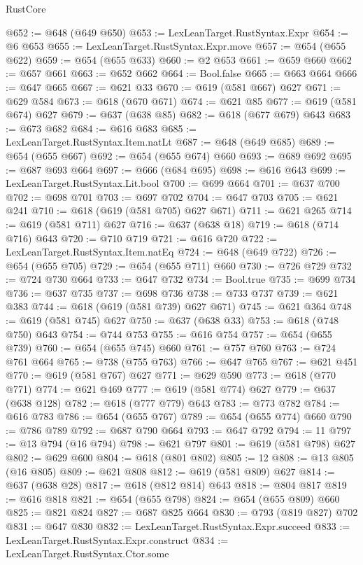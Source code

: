 \begin{lexlean}{RustCore}
\begin{coremodule}
@652 := @648 (@649 @650)
@653 := LexLeanTarget.RustSyntax.Expr
@654 := @6 @653
@655 := LexLeanTarget.RustSyntax.Expr.move
@657 := @654 (@655 @622)
@659 := @654 (@655 @633)
@660 := @2 @653
@661 := @659 @660
@662 := @657 @661
@663 := @652 @662
@664 := Bool.false
@665 := @663 @664
@666 := @647 @665
@667 := @621 @33
@670 := @619 (@581 @667) @627
@671 := @629 @584
@673 := @618 (@670 @671)
@674 := @621 @85
@677 := @619 (@581 @674) @627
@679 := @637 (@638 @85)
@682 := @618 (@677 @679) @643
@683 := @673 @682
@684 := @616 @683
@685 := LexLeanTarget.RustSyntax.Item.natLt
@687 := @648 (@649 @685)
@689 := @654 (@655 @667)
@692 := @654 (@655 @674) @660
@693 := @689 @692
@695 := @687 @693 @664
@697 := @666 (@684 @695)
@698 := @616 @643
@699 := LexLeanTarget.RustSyntax.Lit.bool
@700 := @699 @664
@701 := @637 @700
@702 := @698 @701
@703 := @697 @702
@704 := @647 @703
@705 := @621 @241
@710 := @618 (@619 (@581 @705) @627 @671)
@711 := @621 @265
@714 := @619 (@581 @711) @627
@716 := @637 (@638 @18)
@719 := @618 (@714 @716) @643
@720 := @710 @719
@721 := @616 @720
@722 := LexLeanTarget.RustSyntax.Item.natEq
@724 := @648 (@649 @722)
@726 := @654 (@655 @705)
@729 := @654 (@655 @711) @660
@730 := @726 @729
@732 := @724 @730 @664
@733 := @647 @732
@734 := Bool.true
@735 := @699 @734
@736 := @637 @735
@737 := @698 @736
@738 := @733 @737
@739 := @621 @383
@744 := @618 (@619 (@581 @739) @627 @671)
@745 := @621 @364
@748 := @619 (@581 @745) @627
@750 := @637 (@638 @33)
@753 := @618 (@748 @750) @643
@754 := @744 @753
@755 := @616 @754
@757 := @654 (@655 @739)
@760 := @654 (@655 @745) @660
@761 := @757 @760
@763 := @724 @761 @664
@765 := @738 (@755 @763)
@766 := @647 @765
@767 := @621 @451
@770 := @619 (@581 @767) @627
@771 := @629 @590
@773 := @618 (@770 @771)
@774 := @621 @469
@777 := @619 (@581 @774) @627
@779 := @637 (@638 @128)
@782 := @618 (@777 @779) @643
@783 := @773 @782
@784 := @616 @783
@786 := @654 (@655 @767)
@789 := @654 (@655 @774) @660
@790 := @786 @789
@792 := @687 @790 @664
@793 := @647 @792
@794 := 11
@797 := @13 @794 (@16 @794)
@798 := @621 @797
@801 := @619 (@581 @798) @627
@802 := @629 @600
@804 := @618 (@801 @802)
@805 := 12
@808 := @13 @805 (@16 @805)
@809 := @621 @808
@812 := @619 (@581 @809) @627
@814 := @637 (@638 @28)
@817 := @618 (@812 @814) @643
@818 := @804 @817
@819 := @616 @818
@821 := @654 (@655 @798)
@824 := @654 (@655 @809) @660
@825 := @821 @824
@827 := @687 @825 @664
@830 := @793 (@819 @827) @702
@831 := @647 @830
@832 := LexLeanTarget.RustSyntax.Expr.succeed
@833 := LexLeanTarget.RustSyntax.Expr.construct
@834 := LexLeanTarget.RustSyntax.Ctor.some

\end{coremodule}
\end{lexlean}
